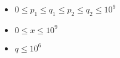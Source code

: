 \begin{itemize}
\tightlist
\item $0\le p_1\le q_1 \le p_2 \le q_2\le 10^9$
\item $0\le x \le 10^9$
\item $q\le 10^6$
\end{itemize}

